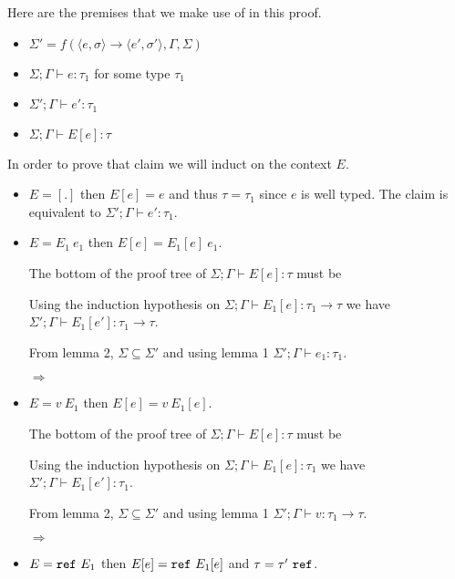 \begin{enumerate}[(a)]
\begin{enumerate}[i.]
\begin{itemize}
Here are the premises that we make use of in this proof.
\begin{itemize}
  \item $\Sigma' = f(\langle e, \sigma \rangle \rightarrow \langle e', \sigma' \rangle, \Gamma, \Sigma)$
  \item $\Sigma;\Gamma \vdash e : \tau_1$ for some type $\tau_1$
  \item $\Sigma';\Gamma \vdash e' : \tau_1$ 
  \item $\Sigma;\Gamma \vdash E[e] : \tau$ 
\end{itemize}
In order to prove that claim we will induct on the context $E$.
\begin{itemize}
  \item $E = [.]$ then $E[e] = e$ and thus $\tau = \tau_1$ since $e$ is well typed. The claim is equivalent to $\Sigma';\Gamma \vdash e' : \tau_1$.
  \item $E = E_1~e_1$ then $E[e] = E_1[e]~e_1$. 

  The bottom of the proof tree of $\Sigma;\Gamma \vdash E[e] : \tau$ must be 

  Using the induction hypothesis on $\Sigma;\Gamma \vdash E_1[e] : \tau_1 \rightarrow\tau$ we have $\Sigma';\Gamma \vdash E_1[e'] : \tau_1 \rightarrow\tau$.

  From lemma 2, $\Sigma \subseteq \Sigma'$ and using lemma 1 $\Sigma' ; \Gamma \vdash e_1 : \tau_1$.

  $\Rightarrow$
  \item $E = v~E_1$ then $E[e] = v~E_1[e]$. 

  The bottom of the proof tree of $\Sigma;\Gamma \vdash E[e] : \tau$ must be 

  Using the induction hypothesis on $\Sigma;\Gamma \vdash E_1[e] : \tau_1$ we have $\Sigma';\Gamma \vdash E_1[e'] : \tau_1$.

  From lemma 2, $\Sigma \subseteq \Sigma'$ and using lemma 1 $\Sigma' ; \Gamma \vdash v : \tau_1 \rightarrow \tau$.

  $\Rightarrow$
  \item $E = \texttt{ref}~E_1$ then $E[e] = \texttt{ref}~E_1[e]$ and $\tau = \tau'~\texttt{ref}$. 


\end{itemize}
\end{itemize}
\end{enumerate}
\end{enumerate}
